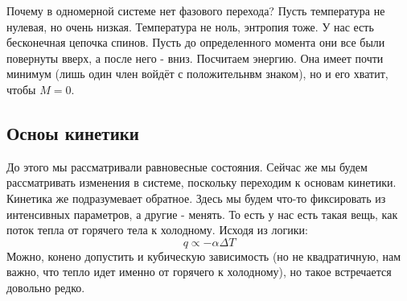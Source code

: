 \documentclass[a4paper, 12pt]{article}
\begin{document}
	Почему в одномерной системе нет фазового перехода? Пусть температура не нулевая, но очень низкая. Температура не ноль, энтропия тоже. У нас есть бесконечная цепочка спинов. Пусть до определенного момента они все были повернуты вверх, а после него - вниз. Посчитаем энергию. Она имеет почти минимум (лишь один член войдёт с положительнвм знаком), но и его хватит, чтобы $M = 0$.
	\subsection{Осноы кинетики}
	До этого мы рассматривали равновесные состояния. Сейчас же мы будем рассматривать изменения в системе, поскольку переходим к основам кинетики.	Кинетика же подразумевает обратное. Здесь мы будем что-то фиксировать из интенсивных параметров, а другие - менять. То есть у нас есть такая вещь, как поток тепла от горячего тела к холодному. Исходя из логики:
	\begin{equation*}
		q \propto - \alpha \Delta T
	\end{equation*}
	Можно, конено допустить и кубическую зависимость (но не квадратичную, нам важно, что тепло идет именно от горячего к холодному), но такое встречается довольно редко.
\end{document}
